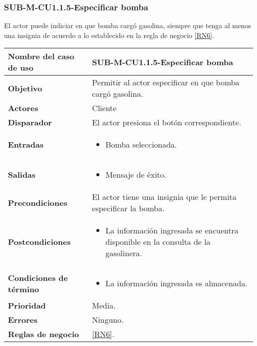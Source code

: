 \subsubsection{SUB-M-CU1.1.5-Especificar bomba}\label{SUB-M-CU1.1.5}
El actor puede indiciar en que bomba cargó gasolina, siempre que tenga al menos una insignia de acuerdo a lo establecido en la regla de negocio \ref{RN6}.

\begin{longtable}{|J{5cm}|J{10.3cm}|}
	\hline
	\textbf{Nombre del caso de uso} &
		SUB-M-CU1.1.5-Especificar bomba \\ \hline
	\textbf{Objetivo} &
		Permitir al actor especificar en que bomba cargó gasolina. \\ \hline
	\textbf{Actores} &
		Cliente \\ \hline 
	\textbf{Disparador} & 
		El actor presiona el botón correspondiente. \\ \hline 
	\textbf{Entradas} & 
		\begin{itemize}
				\item Bomba seleccionada.
		\end{itemize}\\ \hline 
	\textbf{Salidas} & 
		\begin{itemize}
			\item Mensaje de éxito.
		\end{itemize} \\ \hline
	\textbf{Precondiciones} &
		El actor tiene una insignia que le permita especificar la bomba.\\ \hline
	\textbf{Postcondiciones} &
		\begin{itemize}
			\item La información ingresada se encuentra disponible en la consulta de la gasolinera.
		\end{itemize} \\ \hline
	\textbf{Condiciones de término} & 
		\begin{itemize}
			\item La información ingresada es almacenada.
		\end{itemize} \\ \hline 
	\textbf{Prioridad} & 
		Media. \\ \hline
	\textbf{Errores} & Ninguno.
		\\ \hline
	\textbf{Reglas de negocio} & \ref{RN6}.
		 \\ \hline
\end{longtable}

